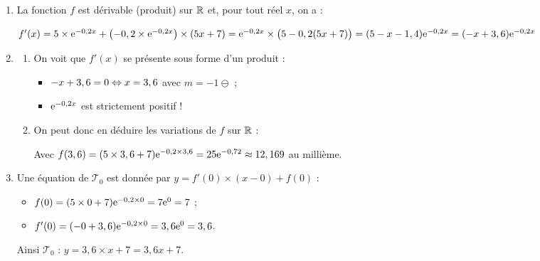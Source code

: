 \documentclass[a4paper,11pt]{article}
\begin{document}
\medskip


\begin{enumerate}
	\item La fonction $f$ est dérivable (produit) sur $\R$ et, pour tout réel $x$, on a :
	
	\hspace{0.5cm}$f'(x)=5 \times {\rm e}^{-0,2x} + \left(-0,2 \times {\rm e}^{-0,2x}\right) \times (5x+7) = {\rm e}^{-0,2x} \times \big( 5 -0,2(5x+7) \big) = (5-x-1,4){\rm e}^{-0,2x}=(-x+3,6){\rm e}^{-0,2x}$
	\item 
	\begin{enumerate}
		\item On voit que $f'(x)$ se présente sous forme d'un produit :
		\begin{itemize}
			\item $-x+3,6=0 \Leftrightarrow x=3,6$ avec $m=-1 \ominus$ ;
			\item ${\rm e}^{-0,2x}$ est strictement positif !
		\end{itemize}
		\begin{center}
		\end{center}
		\item On peut donc en déduire les variations de $f$ sur $\R$ :
		\begin{center}
			
			Avec $f(3,6) = (5 \times 3,6 + 7) {\rm e}^{-0,2 \times 3,6} = 25{\rm e}^{-0,72} \approx 12,169$ au millième.
		\end{center}
	\end{enumerate}	
	\item Une équation de $\mathscr{T}_0$ est donnée par $y=f'(0) \times (x-0) + f(0)$ :
	\begin{itemize}
		\item $f(0)=(5 \times 0+7) {\rm e}^{-0,2 \times 0} = 7{\rm e}^0=7$ ;
		\item $f'(0)=(-0+3,6) {\rm e}^{-0,2 \times 0} = 3,6{\rm e}^0 = 3,6$.
	\end{itemize}
	Ainsi $\mathscr{T}_0$ : $y=3,6 \times x + 7 = 3,6x+7$.
\end{enumerate}
\end{document}
